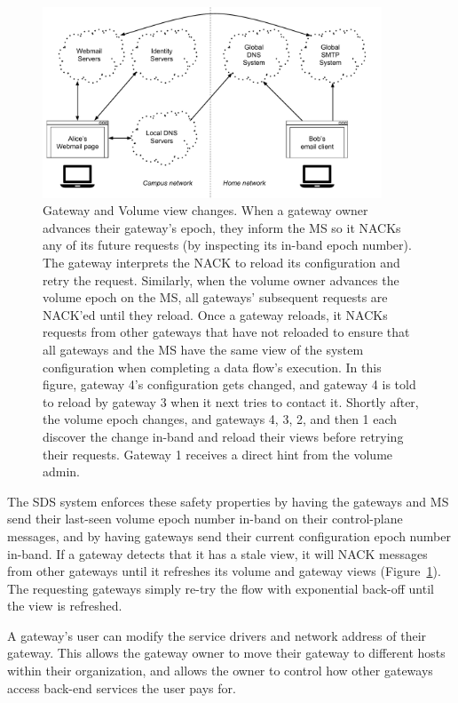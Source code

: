 \begin{figure}[h!]
   \centering
   \includegraphics[width=0.9\textwidth,page=12]{figures/dissertation-figures}
   \caption{Gateway and Volume view changes.  When a gateway owner advances
   their gateway's epoch, they inform the MS so it NACKs any of its future
   requests (by inspecting its in-band epoch number).  The gateway interprets
   the NACK to reload its configuration and retry the request.  Similarly, when
   the volume owner advances the volume epoch on the MS, all gateways'
   subsequent requests are NACK'ed until they reload.  Once a gateway reloads,
   it NACKs requests from other gateways that have not reloaded to ensure that
   all gateways and the MS have the same view of the system configuration
   when completing a data flow's execution.  In this figure, gateway 4's
   configuration gets changed, and gateway 4 is told to reload by gateway 3 when it
   next tries to contact it.  Shortly after, the volume epoch changes, and
   gateways 4, 3, 2, and then 1 each discover the change in-band and reload
   their views before retrying their requests.  Gateway 1 receives a direct hint
   from the volume admin.}
   \label{fig:chap2-view-changes}
\end{figure}

The SDS system enforces these safety properties by having the gateways and MS
send their last-seen volume epoch number in-band on their control-plane messages,
and by having gateways send their
current configuration epoch number in-band.  If a gateway detects that it has a stale
view, it will NACK messages from other gateways until it refreshes its volume
and gateway views (Figure~\ref{fig:chap2-view-changes}).
The requesting gateways simply re-try the flow with
exponential back-off until the view is refreshed.

A gateway's user can modify the service drivers and network address of their
gateway.  This allows the gateway owner to move their gateway to different hosts
within their organization, and allows the owner to control how other gateways
access back-end services the user pays for.


